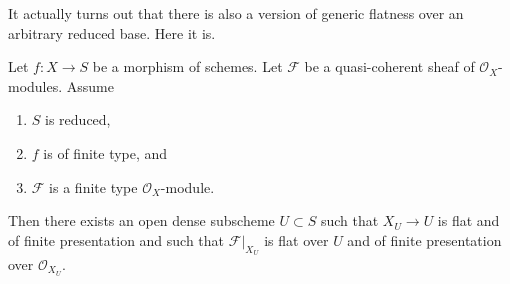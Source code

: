 \noindent
It actually turns out that there is also a version of generic
flatness over an arbitrary reduced base. Here it is.

\begin{proposition}
\label{proposition-generic-flatness-reduced}
Let $f : X \to S$ be a morphism of schemes.
Let $\mathcal{F}$ be a quasi-coherent sheaf of $\mathcal{O}_X$-modules.
Assume
\begin{enumerate}
\item $S$ is reduced,
\item $f$ is of finite type, and
\item $\mathcal{F}$ is a finite type $\mathcal{O}_X$-module.
\end{enumerate}
Then there exists an open dense subscheme $U \subset S$ such that
$X_U \to U$ is flat and of finite presentation and such that
$\mathcal{F}|_{X_U}$ is flat over $U$ and of finite presentation
over $\mathcal{O}_{X_U}$.
\end{proposition}

